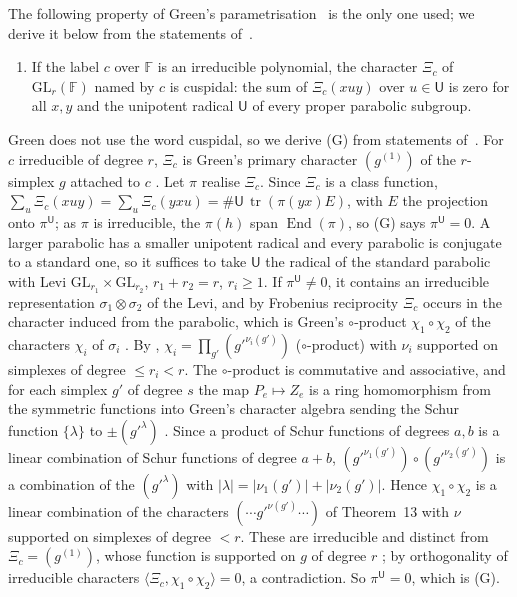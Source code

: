 \documentclass[10pt]{amsart}
\theoremstyle{definition}
\theoremstyle{remark}
\providecommand{\auF}{\mathbb F}
\providecommand{\auGL}{\mathrm{GL}}
\begin{document}
The following property of Green's parametrisation~\cite{Green1955} is the only one used; we
derive it below from the statements of~\cite{Green1955}.
\begin{enumerate}
\item[(G)] If the label $c$ over $\auF$ is an irreducible polynomial, the character $\Xi_c$ of
$\auGL_r(\auF)$ named by $c$ is cuspidal: the sum of $\Xi_c(xuy)$ over $u\in\mathsf U$ is zero for
all $x,y$ and the unipotent radical $\mathsf U$ of every proper parabolic subgroup.
\end{enumerate}
Green does not use the word cuspidal, so we derive (G) from statements of~\cite{Green1955}. For
$c$ irreducible of degree $r$, $\Xi_c$ is Green's primary character $(g^{(1)})$ of the $r$-simplex
$g$ attached to $c$ \cite[Lemma~7.7 and Thm.~12, pp.~438--439]{Green1955}. Let $\pi$ realise
$\Xi_c$. Since $\Xi_c$ is a class function, $\sum_u\Xi_c(xuy)=\sum_u\Xi_c(yxu)=\#\mathsf U\,
\operatorname{tr}(\pi(yx)E)$, with $E$ the projection onto $\pi^{\mathsf U}$; as $\pi$ is
irreducible, the $\pi(h)$ span $\operatorname{End}(\pi)$, so (G) says $\pi^{\mathsf U}=0$. A larger
parabolic has a smaller unipotent radical and every parabolic is conjugate to a standard one, so it
suffices to take $\mathsf U$ the radical of the standard parabolic with Levi
$\auGL_{r_1}\times\auGL_{r_2}$, $r_1+r_2=r$, $r_i\ge1$. If $\pi^{\mathsf U}\ne0$, it contains an
irreducible representation $\sigma_1\otimes\sigma_2$ of the Levi, and by Frobenius reciprocity
$\Xi_c$ occurs in the character induced from the parabolic, which is Green's $\circ$-product
$\chi_1\circ\chi_2$ of the characters $\chi_i$ of $\sigma_i$ \cite[p.~403]{Green1955}. By
\cite[Thm.~13, p.~439]{Green1955}, $\chi_i=\prod_{g'}(g'^{\nu_i(g')})$ ($\circ$-product) with $\nu_i$
supported on simplexes of degree $\le r_i<r$. The $\circ$-product is commutative and associative,
and for each simplex $g'$ of degree $s$ the map $P_e\mapsto Z_e$ is a ring homomorphism from the
symmetric functions into Green's character algebra sending the Schur function $\{\lambda\}$ to
$\pm(g'^{\lambda})$ \cite[Lemma~7.2, p.~436, Def.~7.3, p.~437, and p.~439]{Green1955}. Since a
product of Schur functions of degrees $a,b$ is a linear combination of Schur functions of degree
$a+b$, $(g'^{\nu_1(g')})\circ(g'^{\nu_2(g')})$ is a combination of the $(g'^{\lambda})$ with
$|\lambda|=|\nu_1(g')|+|\nu_2(g')|$. Hence $\chi_1\circ\chi_2$ is a linear combination of the
characters $(\cdots g'^{\nu(g')}\cdots)$ of Theorem~13 with $\nu$ supported on simplexes of degree
$<r$. These are irreducible and distinct from $\Xi_c=(g^{(1)})$, whose function is supported on
$g$ of degree $r$ \cite[Thm.~13 and p.~440]{Green1955}; by orthogonality of irreducible characters
$\langle\Xi_c,\chi_1\circ\chi_2\rangle=0$, a contradiction. So $\pi^{\mathsf U}=0$, which is (G).
\end{document}
